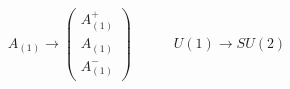 \begin{equation}
\label{encd2}
A_{(1)} \longrightarrow   \begin{pmatrix} A^+_{(1)} \\ A_{(1)} \\
A^-_{(1)}
\end{pmatrix}   \qquad \quad U(1) \longrightarrow SU(2)
\end{equation}

